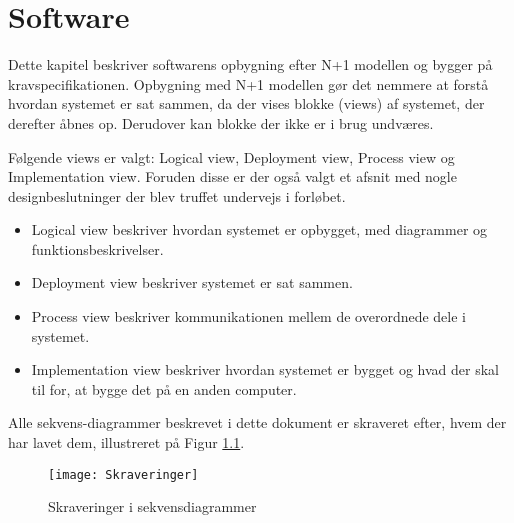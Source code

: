 \documentclass[Main]{subfiles}
\begin{document}
\chapter{Software}
Dette kapitel beskriver softwarens opbygning efter N+1 modellen\cite{Larman} og bygger på kravspecifikationen\cite{KravSpec}. 
Opbygning med N+1 modellen gør det nemmere at forstå hvordan systemet er sat sammen, da der vises blokke (views) af systemet, der derefter åbnes op.
Derudover kan blokke der ikke er i brug undværes.

Følgende views er valgt:
Logical view, Deployment view, Process view og Implementation view.
Foruden disse er der også valgt et afsnit med nogle designbeslutninger der blev truffet undervejs i forløbet.

\begin{itemize}
\item Logical view beskriver hvordan systemet er opbygget, med diagrammer og funktionsbeskrivelser.
\item Deployment view beskriver systemet er sat sammen.
\item Process view beskriver kommunikationen mellem de overordnede dele i systemet.
\item Implementation view beskriver hvordan systemet er bygget og hvad der skal til for, at bygge det på en anden computer.
\end{itemize}

Alle sekvens-diagrammer beskrevet i dette dokument er skraveret efter, hvem der har lavet dem, illustreret på Figur \ref{Fig:Skraveringer}.
\begin{figure}[H]
\centering
\texttt{[image: Skraveringer]}
\caption{Skraveringer i sekvensdiagrammer}
\label{Fig:Skraveringer}
\end{figure}

\newpage


\newpage


\newpage


\newpage


\newpage

\end{document}
